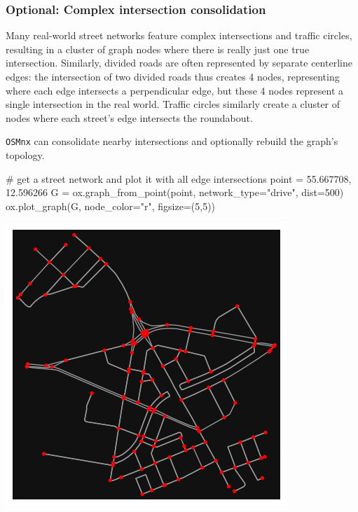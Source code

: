 \documentclass[
  letterpaper,
  DIV=11,
  numbers=noendperiod]{scrreprt}
\newenvironment{Shaded}{\begin{snugshade}}{\end{snugshade}}
\newcommand{\CommentTok}[1]{\textcolor[rgb]{0.37,0.37,0.37}{#1}}
\newcommand{\DecValTok}[1]{\textcolor[rgb]{0.68,0.00,0.00}{#1}}
\newcommand{\FloatTok}[1]{\textcolor[rgb]{0.68,0.00,0.00}{#1}}
\newcommand{\NormalTok}[1]{\textcolor[rgb]{0.00,0.23,0.31}{#1}}
\newcommand{\OperatorTok}[1]{\textcolor[rgb]{0.37,0.37,0.37}{#1}}
\newcommand{\StringTok}[1]{\textcolor[rgb]{0.13,0.47,0.30}{#1}}
\begin{document}
\subsubsection{Optional: Complex intersection
consolidation}\label{optional-complex-intersection-consolidation}

Many real-world street networks feature complex intersections and
traffic circles, resulting in a cluster of graph nodes where there is
really just one true intersection. Similarly, divided roads are often
represented by separate centerline edges: the intersection of two
divided roads thus creates 4 nodes, representing where each edge
intersects a perpendicular edge, but these 4 nodes represent a single
intersection in the real world. Traffic circles similarly create a
cluster of nodes where each street's edge intersects the roundabout.

\texttt{OSMnx} can consolidate nearby intersections and optionally
rebuild the graph's topology.

\begin{Shaded}
\begin{Highlighting}[]
\CommentTok{\# get a street network and plot it with all edge intersections}
\NormalTok{point }\OperatorTok{=} \FloatTok{55.667708}\NormalTok{, }\FloatTok{12.596266}
\NormalTok{G }\OperatorTok{=}\NormalTok{ ox.graph\_from\_point(point, network\_type}\OperatorTok{=}\StringTok{"drive"}\NormalTok{, dist}\OperatorTok{=}\DecValTok{500}\NormalTok{)}
\NormalTok{ox.plot\_graph(G, node\_color}\OperatorTok{=}\StringTok{"r"}\NormalTok{, figsize}\OperatorTok{=}\NormalTok{(}\DecValTok{5}\NormalTok{,}\DecValTok{5}\NormalTok{))}
\end{Highlighting}
\end{Shaded}

\includegraphics{labs/w07_OSM_files/figure-pdf/cell-18-output-1.png}
\end{document}
